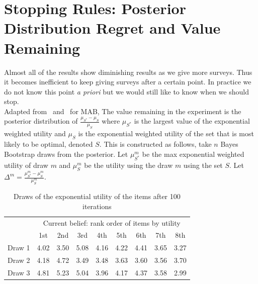 \documentclass[a4paper,12pt]{article}
\begin{document}
\section{Stopping Rules: Posterior Distribution Regret and Value Remaining}
Almost all of the results show diminishing results as we give more surveys. Thus it becomes inefficient to keep giving surveys after a certain point. In practice we do not know this point \textit{a priori} but we would still like to know when we should stop.\\
Adapted from~\cite{scott2015multi} and~\cite{scott2010modern} for MAB, The value remaining in the experiment is the posterior distribution of $\frac{\mu_{S^*}-\mu_{S}}{\mu_{S}}$ where $\mu_{S^*}$ is the largest value of the exponential weighted utility and $\mu_{S}$ is the exponential weighted utility of the set that is most likely to be optimal, denoted $S$. This is constructed as follows, take $n$ Bayes Bootstrap draws from the posterior. Let $\mu_{S^*}^{m}$ be the max exponential weighted utility of draw $m$ and $\mu_{S}^{m}$ be the utility using the draw $m$ using the set $S$. Let $\Delta^{m}=\frac{\mu^m_{S^*}-\mu^m_{S}}{\mu^m_{S}}$.\\
\begin{table}
\begin{center}
\begin{tabular}{l | c c c c c c c c}
& \multicolumn{8}{c}{Current belief: rank order of items by utility} \\
& 1st &  2nd  &  3rd  &  4th &  5th & 6th & 7th &  8th \\
\hline
Draw 1 & 4.02 &  3.50 &  5.08 & 4.16&  4.22 & 4.41 & 3.65 &  3.27 \\
Draw 2 &4.18 & 4.72 & 3.49 & 3.48 & 3.63 & 3.60 & 3.56 &  3.70 \\
Draw 3 &4.81 & 5.23 & 5.04 &  3.96 &  4.17 & 4.37 &  3.58 & 2.99 \\ 
\end{tabular}
\end{center}
\caption{Draws of the exponential utility of the items after 100 iterations}
\label{table:data}
\end{table}
\end{document}
